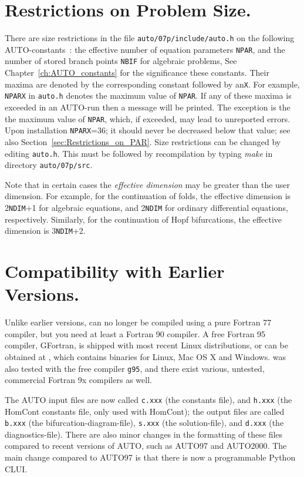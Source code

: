 \documentclass[12pt]{report}
\begin{document}
\section{ Restrictions on Problem Size.} \label{sec:Restrictions}
There are size restrictions in the file {\tt auto/07p/include/auto.h}
on the following {\cal AUTO}-constants~:
the effective number of equation parameters {\tt NPAR}, and
the number of stored branch points {\tt NBIF} for algebraic problems,
See Chapter~\ref{ch:AUTO_constants} 
for the significance these constants. 
Their maxima are denoted by the  corresponding constant followed by an{\tt X}.
For example, {\tt NPARX} in {\tt auto.h} denotes the maximum value 
of {\tt NPAR}.
If any of these maxima is exceeded in an {\cal AUTO}-run then a message 
will be printed.
The exception is the the maximum value of {\tt NPAR},
which, if exceeded, may lead to unreported errors.
Upon installation {\tt NPARX}=36; it should never be decreased below that value;
see also Section~\ref{sec:Restrictions_on_PAR}.
Size restrictions can be changed by editing {\tt auto.h}.
This must be followed by recompilation by typing {\it make} 
in directory {\tt auto/07p/src}.

Note that in certain cases the {\it effective dimension} may be greater
than the user dimension.
For example, for the continuation of folds,
the effective dimension is 2{\tt NDIM}+1 for algebraic equations,
and 2{\tt NDIM} for ordinary differential equations, respectively.
Similarly, for the continuation of Hopf bifurcations,
the effective dimension is 3{\tt NDIM}+2.
 
 
\section{Compatibility with Earlier Versions.} \label{sec:Compatibility}
Unlike earlier versions, \AUTO can no longer be compiled using a pure
Fortran 77 compiler, but you need at least a Fortran 90 compiler.
A free Fortran 95 compiler, GFortran, is shipped with most recent
Linux distributions, or can be obtained at
, which contains binaries for
Linux, Mac OS X and Windows. \AUTO was also tested with the free
compiler {\tt g95}, and there exist various, untested, commercial Fortran
9x compilers as well.

The {\cal AUTO} input files are now called 
{\tt c.xxx} (the constants file),
and
{\tt h.xxx} (the {\cal HomCont} constants file, only used with {\cal HomCont});
the output files are called
{\tt b.xxx} (the bifurcation-diagram-file),
{\tt s.xxx} (the solution-file),
and
{\tt d.xxx} (the diagnostics-file).
There are also minor changes in the formatting of these files 
compared to recent versions of {\cal AUTO}, such as {\cal AUTO97} 
and {\cal AUTO2000}.
The main change compared to {\cal AUTO97} is that there is now a
programmable Python CLUI.
\end{document}
